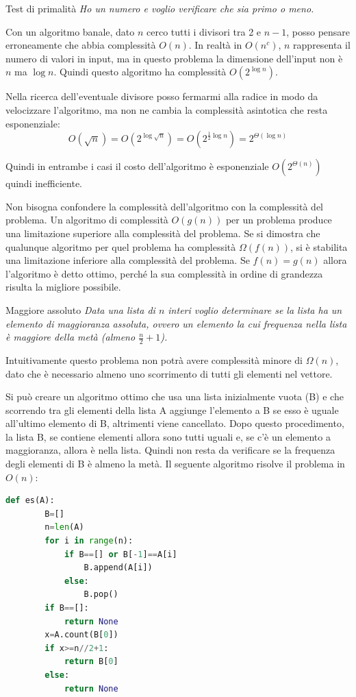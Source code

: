 \begin{Exercise}{Test di primalità}{}
    \textit{Ho un numero e voglio verificare che sia primo o meno.}

    Con un algoritmo banale, dato $n$ cerco tutti i divisori tra 2 e $n-1$, posso pensare erroneamente che abbia complessità $O(n)$. In realtà in $O(n^c)$, $n$ rappresenta il numero di valori in input, ma in questo problema la dimensione dell'input non è $n$ ma $\log n$. Quindi questo algoritmo ha complessità $O(2^{\log n})$.

    Nella ricerca dell'eventuale divisore posso fermarmi alla radice in modo da velocizzare l'algoritmo, ma non ne cambia la complessità asintotica che resta esponenziale:
    \begin{equation*}
        O(\sqrt{n})=O(2^{\log\sqrt{n}})=O(2^{\frac{1}{2}\log n})=2^{\Theta(\log n)}
    \end{equation*}

    Quindi in entrambe i casi il costo dell'algoritmo è esponenziale $O(2^{\Theta(n)})$ quindi inefficiente.
\end{Exercise}

Non bisogna confondere la complessità dell'algoritmo con la complessità del problema. Un algoritmo di complessità $O(g(n))$ per un problema produce una limitazione superiore alla complessità del problema. Se si dimostra che qualunque algoritmo per quel problema ha complessità $\Omega(f(n))$, si è stabilita una limitazione inferiore alla complessità del problema. Se $f(n)=g(n)$ allora l'algoritmo è detto ottimo, perché la sua complessità in ordine di grandezza risulta la migliore possibile.

\begin{Exercise}{Maggiore assoluto}{}
    \textit{Data una lista di $n$ interi voglio determinare se la lista ha un elemento di maggioranza assoluta, ovvero un elemento la cui frequenza nella lista è maggiore della metà (almeno $\frac{n}{2}+1$).}

    Intuitivamente questo problema non potrà avere complessità minore di $\Omega(n)$, dato che è necessario almeno uno scorrimento di tutti gli elementi nel vettore. 
    
    Si può creare un algoritmo ottimo che usa una lista inizialmente vuota (B) e che scorrendo tra gli elementi della lista A aggiunge l'elemento a B se esso è uguale all'ultimo elemento di B, altrimenti viene cancellato. Dopo questo procedimento, la lista B, se contiene elementi allora sono tutti uguali e, se c'è un elemento a maggioranza, allora è nella lista. Quindi non resta da verificare se la frequenza degli elementi di B è almeno la metà. Il seguente algoritmo risolve il problema in $O(n)$:
    \begin{lstlisting}[language=Python]
    def es(A):
        B=[]
        n=len(A)
        for i in range(n):
            if B==[] or B[-1]==A[i]
                B.append(A[i])
            else:
                B.pop()
        if B==[]:
            return None
        x=A.count(B[0])
        if x>=n//2+1:
            return B[0]
        else:
            return None
    \end{lstlisting}
\end{Exercise}